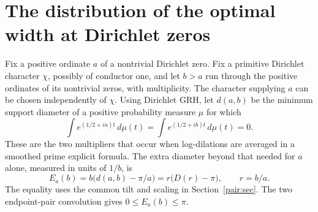 \documentclass[11pt,letterpaper]{article}
\theoremstyle{remark}\newtheorem{remark}[theorem]{Remark}
\begin{document}
\section{The distribution of the optimal width at Dirichlet zeros}
\label{pair:limit-sec}
Fix a positive ordinate $a$ of a nontrivial Dirichlet zero. Fix a
primitive Dirichlet character $\chi$, possibly of conductor one, and let
$b>a$ run through the positive ordinates of its nontrivial zeros,
with multiplicity. The character supplying $a$ can be chosen independently
of $\chi$. Using Dirichlet GRH, let $d(a,b)$ be the minimum support
diameter of a positive probability measure $\mu$ for which
\[
 \int e^{(1/2+ia)t}\,d\mu(t)=\int e^{(1/2+ib)t}\,d\mu(t)=0.
\]
These are the two multipliers that occur when log-dilations are averaged
in a smoothed prime explicit formula. The extra diameter beyond that
needed for $a$ alone, measured in units of $1/b$, is
\[
 E_a(b)=b\bigl(d(a,b)-\pi/a\bigr)
       =r\bigl(D(r)-\pi\bigr),\qquad r=b/a.
\]
The equality uses the common tilt and scaling in Section~\ref{pair:sec}.
The two endpoint-pair convolution gives $0\le E_a(b)\le\pi$.
\end{document}
